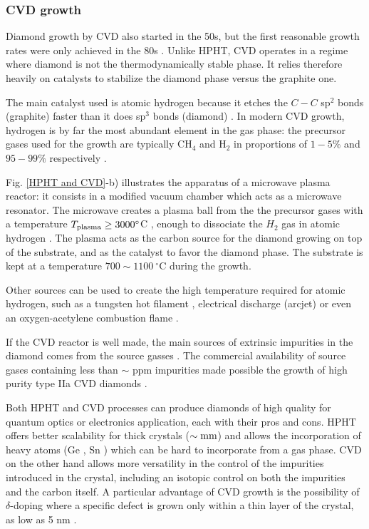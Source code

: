 \documentclass[a4paper,11pt]{report}
\begin{document}
\subsubsection{CVD growth}

Diamond growth by CVD also started in the 50s, but the first reasonable growth rates were only achieved in the 80s \citep{matsumoto1982growth, matsumoto1982vapor, kamo1983diamond}. Unlike HPHT, CVD operates in a regime where diamond is not the thermodynamically stable phase. It relies therefore heavily on catalysts to stabilize the diamond phase versus the graphite one. 

The main catalyst used is atomic hydrogen because it etches the $C-C$ sp$^2$ bonds (graphite) faster than it does sp$^3$ bonds (diamond) \citep{gracio2010diamond}. In modern CVD growth, hydrogen is by far the most abundant element in the gas phase: the precursor gases used for the growth are typically CH$_4$ and H$_2$ in proportions of $1-5\%$ and $95-99\%$ respectively \citep{achard2020chemical}.

Fig. \ref{HPHT and CVD}-b) illustrates the apparatus of a microwave plasma reactor: it consists in a modified vacuum chamber which acts as a microwave resonator. The microwave creates a plasma ball from the the precursor gases with a temperature $T_{\rm plasma} \geq 3000 ^\circ$C \citep{ashfold2020nitrogen}, enough to dissociate the $H_2$ gas in atomic hydrogen \citep{balmer2009chemical}. The plasma acts as the carbon source for the diamond growing on top of the substrate, and as the catalyst to favor the diamond phase. The substrate is kept at a temperature $700 \sim 1100\ ^\circ$C during the growth.

Other sources can be used to create the high temperature required for atomic hydrogen, such as a tungsten hot filament \citep{haubner1993diamond}, electrical discharge (arcjet) \citep{luque1998excited} or even an oxygen-acetylene combustion flame \citep{bachmann1991towards}.

If the CVD reactor is well made, the main sources of extrinsic impurities in the diamond comes from the source gasses \citep{balmer2009chemical}. The commercial availability of source gases containing less than $\sim$ ppm impurities made possible the growth of  high purity type IIa CVD diamonds \citep{kasu2003high, twitchen2004high, tallaire2006characterisation}.

\medskip
Both HPHT and CVD processes can produce diamonds of high quality for quantum optics or electronics application, each with their pros and cons. HPHT offers better scalability for thick crystals ($\sim \rm mm$) and allows the incorporation of heavy atoms (Ge \citep{palyanov2015germanium} , Sn \citep{ekimov2019effect}) which can be hard to incorporate from a gas phase. CVD on the other hand allows more versatility in the control of the impurities introduced in the crystal, including an isotopic control on both the impurities and the carbon itself. A particular advantage of CVD growth is the possibility of $\delta$-doping where a specific defect is grown only within a thin layer of the crystal, as low as 5 nm \citep{ohno2012engineering, ishikawa2012optical, ohashi2013negatively}.
\end{document}
